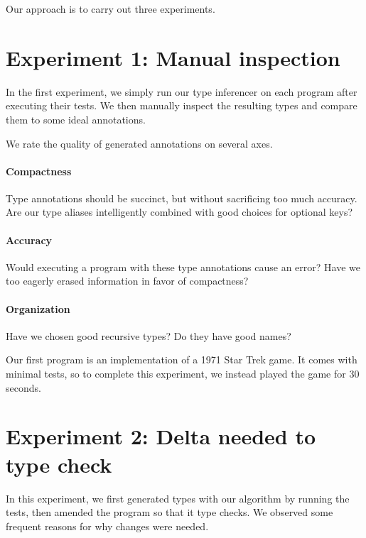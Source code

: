Our approach is to carry out three experiments.

\section{Experiment 1: Manual inspection}

In the first experiment, we simply run our 
type inferencer on each program after executing
their tests.
We then manually inspect the resulting
types and compare them to some ideal
annotations.

We rate the quality of generated annotations
on several axes.

\paragraph{Compactness} Type annotations should be succinct,
        but without sacrificing too much accuracy.
        Are our type aliases intelligently combined
        with good choices for optional keys?

  \paragraph{Accuracy} Would executing a program with these
      type annotations cause an error?
      Have we too eagerly erased information in favor
      of compactness?

  \paragraph{Organization} Have we chosen good recursive types?
      Do they have good names?

Our first program is an implementation of a
1971 Star Trek game.
It comes with minimal tests, so to complete this experiment,
we instead played the game for 30 seconds.

\section{Experiment 2: Delta needed to type check}

In this experiment, we first generated types with our algorithm
by running the tests, then amended the program so that it
type checks.
We observed some frequent reasons for why changes were needed.

